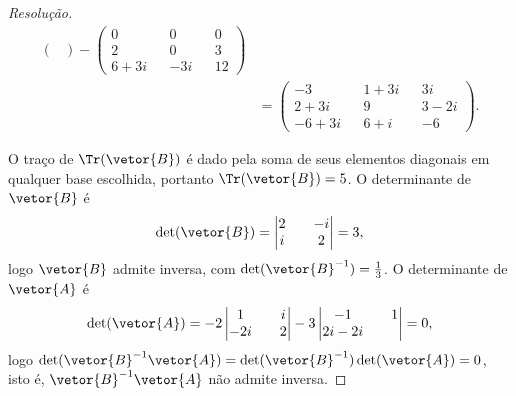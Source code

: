 \begin{proof}[Resolução]
\begin{align*}
\begin{pmatrix}
                                          \end{pmatrix}-
                                          \begin{pmatrix}
                                              0 && 0 && 0\\
                                              2 && 0 && 3\\
                                              6+3i && -3i && 12
                                          \end{pmatrix}\\
                                          &= \begin{pmatrix}
                                              -3 && 1+3i && 3i\\
                                              2 + 3i && 9 && 3 - 2i\\
                                              -6+3i && 6 + i && -6
                                          \end{pmatrix}.
    \end{align*}

    O traço de \(\Tr(\vetor{B})\) é dado pela soma de seus elementos diagonais em qualquer base escolhida, portanto \(\Tr(\vetor{B}) = 5\). O determinante de \(\vetor{B}\) é
    \begin{equation*}
        \det(\vetor{B}) = \begin{vmatrix}
            2 && -i\\
            i && 2
        \end{vmatrix} = 3,
    \end{equation*}
    logo \(\vetor{B}\) admite inversa, com \(\det(\vetor{B}^{-1}) = \frac13\). O determinante de \(\vetor{A}\) é
    \begin{equation*}
        \det(\vetor{A}) = -2 \begin{vmatrix}
            1 && i\\
            -2i && 2
        \end{vmatrix} - 3 \begin{vmatrix}
            -1 && 1\\
            2i -2i
        \end{vmatrix} = 0,
    \end{equation*}
    logo \(\det(\vetor{B}^{-1}\vetor{A}) = \det(\vetor{B}^{-1})\det(\vetor{A}) = 0\), isto é, \(\vetor{B}^{-1}\vetor{A}\) não admite inversa.
\end{proof}
